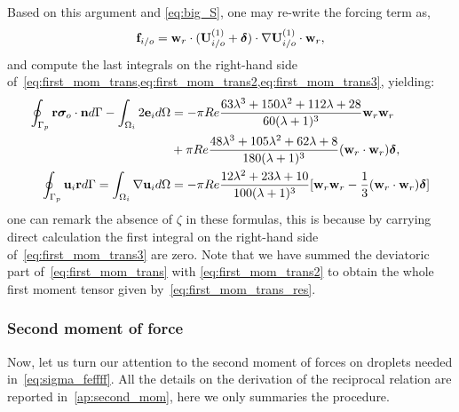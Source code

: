 Based on this argument and \ref{eq:big_S}, one may re-write the forcing term as,
\begin{equation}
    \textbf{f}_{i/o}
    =
    \textbf{w}_r \cdot
    (\textbf{U}_{i/o}^{(1)} +\bm\delta)\cdot \grad \textbf{U}_{i/o}^{(1)}\cdot \textbf{w}_r,
    \label{eq:forcing_inner}
\end{equation}
and compute the last integrals on the right-hand side of~\ref{eq:first_mom_trans,eq:first_mom_trans2,eq:first_mom_trans3}, yielding: 
\begin{align}
    \label{eq:first_mom_trans_res}
    \intS[p]{\textbf{r}\bm\sigma_{o}\cdot \textbf{n}}
    - \intO[i]{2\textbf{e}_i}
    &= 
    -\pi Re  \frac{63 \lambda^{3} + 150 \lambda^{2} + 112 \lambda + 28}{60 (\lambda+1)^{3}} \textbf{w}_r \textbf{w}_r
    \\ \nonumber
    &+
    \pi Re  \frac{48 \lambda^{3} + 105 \lambda^2+62\lambda + 8}{180 (\lambda+1)^3} (\textbf{w}_r\cdot \textbf{w}_r) \bm\delta,
     \\
    \label{eq:first_mom_trans_res3}
    \intS[p]{\textbf{u}_{i} \textbf{r}}
    =
    \intO[i]{\grad\textbf{u}_{i}}
    &=
    -\pi Re \frac{12\lambda^2+23\lambda +10}{100(\lambda+1)^3}[\textbf{w}_r\textbf{w}_r-\frac{1}{3} (\textbf{w}_r\cdot \textbf{w}_r )\bm\delta]
\end{align}
one can remark the absence of $\zeta$ in these formulas, this is because by carrying direct calculation the first integral on the right-hand side of~\ref{eq:first_mom_trans3} are zero. 
Note that we have summed the deviatoric part of~\ref{eq:first_mom_trans} with \ref{eq:first_mom_trans2} to obtain the whole first moment tensor given by~\ref{eq:first_mom_trans_res}. 



\subsubsection{Second moment of force}

Now, let us turn our attention to the second moment of forces on droplets needed in~\ref{eq:sigma_feffff}. 
All the details on the derivation of the reciprocal relation are reported in~\ref{ap:second_mom}, here we only summaries the procedure. 

